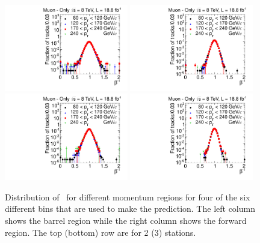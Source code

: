 \begin{figure}
\begin{center}
\includegraphics[clip=false, trim=0.0cm 0cm 0.0cm 0cm, width=0.48\textwidth]{figures/muonly/Control_Data8TeV_Pt_TOFSpectrum_Binned_0}
\includegraphics[clip=false, trim=0.0cm 0cm 0.0cm 0cm, width=0.48\textwidth]{figures/muonly/Control_Data8TeV_Pt_TOFSpectrum_Binned_3} \\
\includegraphics[clip=false, trim=0.0cm 0cm 0.0cm 0cm, width=0.48\textwidth]{figures/muonly/Control_Data8TeV_Pt_TOFSpectrum_Binned_1}
\includegraphics[clip=false, trim=0.0cm 0cm 0.0cm 0cm, width=0.48\textwidth]{figures/muonly/Control_Data8TeV_Pt_TOFSpectrum_Binned_4}
\caption[Distribution of \invbeta\
for different momentum regions for two and three station tracks in the \muononly\ analysis.]
{Distribution of \invbeta\ 
for different momentum regions for four of the six different bins that are used to make the prediction.
The left column shows the barrel region while the right column
shows the forward region.  The top (bottom) row are for 2 (3) stations.}
\label{fig:MuOnlyControl}
\end{center}
\end{figure}

